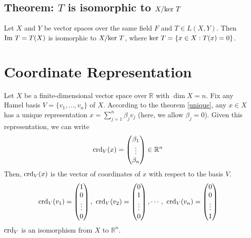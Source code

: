 \documentclass[11pt]{elegantbook}
\begin{document}
\subsection{Theorem: $T$ is isomorphic to $X/\textnormal{ker }T$}
\begin{theorem}
    Let $X$ and $Y$ be vector spaces over the same field $F$ and $T \in L(X, Y)$. Then $\textnormal{Im }T=T(X)$ is isomorphic to $X/\textnormal{ker }T$, where $\textnormal{ker }T=\{x\in X:T(x)=0\}$.
\end{theorem}



\section{Coordinate Representation}
Let $X$ be a finite-dimensional vector space over $\mathbb{R}$ with $\dim X = n$. Fix any Hamel basis $V = \{v_1, ... , v_n\}$ of $X$. According to the theorem \ref{unique}, any $x \in X$ has a unique representation $x=\sum_{j=1}^n\beta_j v_j$ (here, we allow $\beta_j = 0$). Given this representation, we can write $$\textnormal{crd}_V(x)=\begin{pmatrix}
    \beta_1\\
    \vdots\\
    \beta_n
\end{pmatrix}\in \mathbb{R}^n$$
Then, $\textnormal{crd}_V(x)$ is the vector of coordinates of $x$ with respect to the basis $V$.
\begin{equation}
    \begin{aligned}
        \textnormal{crd}_V(v_1)=\begin{pmatrix}
            1\\
            0\\
            \vdots\\
            0
        \end{pmatrix},\
        \textnormal{crd}_V(v_2)=\begin{pmatrix}
            0\\
            1\\
            \vdots\\
            0
        \end{pmatrix},\cdots,\
        \textnormal{crd}_V(v_n)=\begin{pmatrix}
            0\\
            0\\
            \vdots\\
            1
        \end{pmatrix}
    \end{aligned}
    \nonumber
\end{equation}
$\textnormal{crd}_V$ is an isomorphism from $X$ to $\mathbb{R}^n$.
\end{document}
